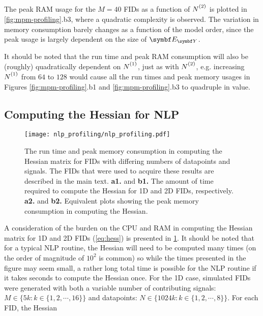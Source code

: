 The peak \ac{RAM} usage for the $M=40$ \acp{FID} as a function of $\Ntwo$ is
plotted in \cref{fig:mpm-profiling}.b3, where a quadratic complexity is
observed. The variation in memory consumption barely changes as a function of
the model order, since the peak usage is largely dependent on the size of
$\EY$.

It should be noted that the run time and peak \ac{RAM} consumption will also be
(roughly) quadratically dependent on $\None$, just as with $\Ntwo$, e.g.
increasing  $\None$ from  $64$ to $128$ would cause all the run times and peak
memory usages in Figures \ref{fig:mpm-profiling}.b1 and
\ref{fig:mpm-profiling}.b3 to quadruple in value.


\subsection{Computing the Hessian for \acs{NLP}}
\begin{figure}
    \centering
    \texttt{[image: nlp\_profiling/nlp\_profiling.pdf]}
    \caption[
        The run time and peak memory consumption in computing the Hessian
        matrix for \acsp{FID} with differing numbers of datapoints and signals.
    ]
    {
        The run time and peak memory consumption in computing the Hessian
        matrix for \acsp{FID} with differing numbers of datapoints and signals.
        The \acp{FID} that were used to acquire these results are described in
        the main text.
        \textbf{a1.} and \textbf{b1.} The amount of time required to compute the
        Hessian for \ac{1D} and \ac{2D} \acp{FID}, respectively.
        \textbf{a2.} and \textbf{b2.} Equivalent plots showing the peak memory
        consumption in computing the Hessian.
    }
    \label{fig:nlp-profiling}
\end{figure}
A consideration of the burden on the \ac{CPU} and \ac{RAM} in computing the
Hessian matrix for \ac{1D} and \ac{2D} \acp{FID} (\cref{eq:hess}) is presented in
\cref{fig:nlp-profiling}.
It should be noted that for a typical \ac{NLP} routine, the Hessian will need
to be computed many times (on the order of magnitude of $10^2$ is common) so
while the times presented in the figure may seem small, a rather long total
time is possible for the \ac{NLP} routine if it takes seconds to compute the
Hessian once.
For the \ac{1D} case, simulated \acp{FID} were generated
with both a variable number of contributing signals: $M \in \lbrace 5k : k \in
\lbrace 1, 2, \cdots, 16 \rbrace \rbrace$ and datapoints: $N \in \lbrace 1024k
: k \in \lbrace 1, 2, \cdots, 8 \rbrace \rbrace$. For each \ac{FID}, the Hessian
